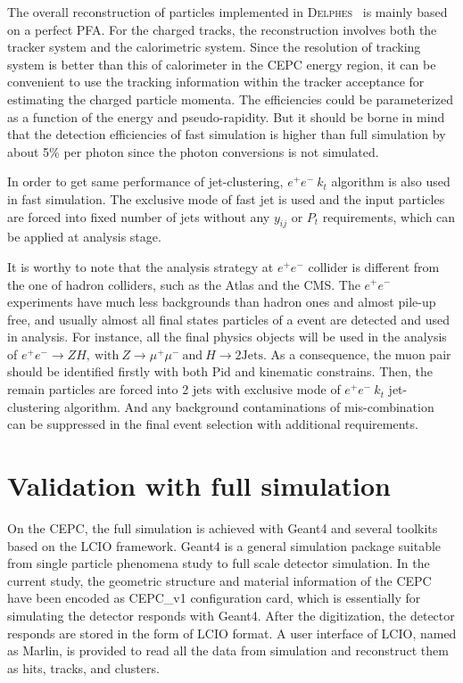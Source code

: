 \documentclass[a4paper,10pt,twoside]{cpc-hepnp}
\begin{document}
\begin{multicols}{2}
The overall reconstruction of particles implemented in {\textsc{Delphes}~} is mainly based on a perfect PFA.
For the charged tracks, the reconstruction involves both the tracker system and the calorimetric system.
Since the resolution of tracking system is better than this of calorimeter in the CEPC energy region,
it can be convenient to use the tracking information within the tracker acceptance for estimating the charged particle momenta.
The efficiencies could be parameterized as a function of the energy and pseudo-rapidity. But it should be borne in mind
that the detection efficiencies of fast simulation is higher than full simulation by about 5\% per photon
since the photon conversions is not simulated.   



In order to get same performance of jet-clustering, $e^+e^-~k_t$ algorithm is also used in fast simulation.
The exclusive mode of fast jet is used and the input particles are forced into fixed number of jets
without any $y_{ij}$ or $P_t$ requirements, which can be applied at analysis stage.

It is worthy to note that the analysis strategy at $e^+e^-$ collider is different from the one of hadron colliders,
such as the Atlas and the CMS.  The $e^+e^-$ experiments have much less backgrounds than hadron ones and almost pile-up free,
and usually almost all final states particles of a event are detected and used in analysis.
For instance, all the final physics objects will be used in the analysis of
$e^+e^- \to ZH,~\mbox{with}~Z \to\mu^+\mu^-~\mbox{and}~H \to 2\mbox{Jets} $.
As a consequence, the muon pair should be identified firstly with both Pid and kinematic constrains.
Then, the remain particles are forced into 2 jets with exclusive mode of $e^+e^-~k_t$ jet-clustering algorithm.
And any background contaminations of mis-combination can be suppressed in the final event selection with additional requirements.


\section{Validation with full simulation\label{sec:validation}}


On the CEPC, the full simulation is achieved with Geant4 and several toolkits based on the LCIO framework\cite{ref:lcio}.
Geant4\cite{ref:geant4} is a general simulation package suitable from single particle phenomena study to full scale detector simulation.
In the current study, the geometric structure and material information of the CEPC have been encoded as CEPC\_v1 configuration card,
which is essentially for simulating the detector responds with Geant4.
After the digitization, the detector responds are stored in the form of LCIO format.
A user interface of LCIO, named as Marlin, is provided to read all the data from simulation and reconstruct them as hits, tracks, and clusters.


\end{multicols}
\end{document}
